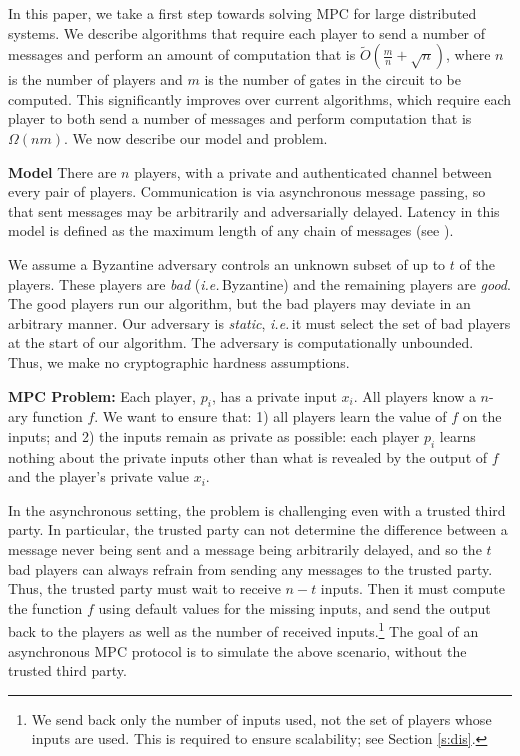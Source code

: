 \documentclass[10pt]{llncs}
\newcommand{\parasec}[1]{\vspace{8px}\noindent\textbf{#1}\hspace{5px}}
\newcommand{\ie}{\emph{i.e.\,}}
\begin{document}
In this paper, we take a first step towards solving MPC for large distributed systems.  We describe algorithms that require each player to send a number of messages and perform an
amount of computation that is $\tilde{O}(\frac{m}{n} + \sqrt n)$, where $n$ is the number of players and $m$ is the number of gates in the circuit to be computed. This significantly improves over current algorithms, which require each player to both send a number of messages and perform computation that
is $\Omega(nm)$.  We now describe our model and problem.
 
\parasec{Model} There are $n$ players, with a private and authenticated channel between every pair of players.  Communication is via asynchronous message passing, so that sent messages may be arbitrarily and adversarially delayed. Latency in this model is defined as the maximum length of any chain of messages (see \cite{CD,AW}). 

We assume a Byzantine adversary controls an unknown subset of up to $t$ of the players.  These players are \emph{bad} (\ie Byzantine) and the remaining
players are \emph{good}. The good players run our algorithm, but the bad players may deviate in an arbitrary manner.  Our adversary is \emph{static}, \ie it must select the set of bad players at the start of our algorithm.  The adversary is computationally unbounded. Thus, we make no cryptographic hardness assumptions.

\smallskip
\noindent
{\bf MPC Problem:} Each player, $p_{i}$, has a private input $x_{i}$.  All players know a $n$-ary function $f$.  We want to ensure that: 1) all players learn the value of $f$ on the inputs; and 2) the inputs remain as private as possible: each player $p_{i}$ learns nothing about the private inputs other than what is revealed by the output of $f$ and the player's private value $x_i$.

In the asynchronous setting, the problem is challenging even with a
trusted third party.   In particular, the trusted party can not determine the difference between a message never being sent and a message being arbitrarily delayed, and so the $t$ bad players can always refrain from sending any messages to the trusted party.   Thus, the trusted party must wait to receive $n-t$ inputs.  Then it must compute the function $f$ using default values for the missing inputs, and send the output  back to the players as well as the number of received inputs.\footnote{We send back only the number of inputs used, not the set of players whose inputs are used. This is required to ensure scalability; see Section \ref{s:dis}.}  The goal of an asynchronous MPC protocol is to
simulate the above scenario, without the trusted third party. 
\end{document}
